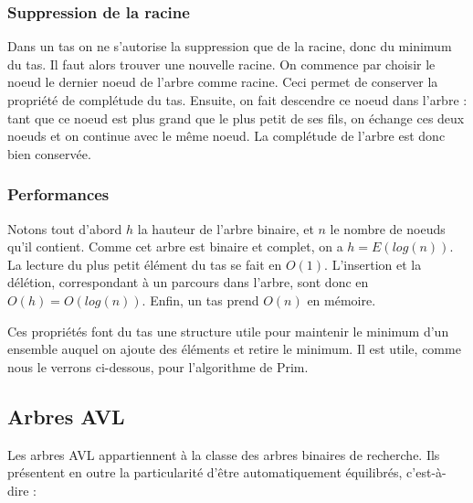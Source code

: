 \documentclass{article}
\begin{document}
\subsubsection{Suppression de la racine}
Dans un tas on ne s'autorise la suppression que de la racine, donc du minimum du tas. Il faut alors trouver une nouvelle racine. On commence par choisir le noeud le 
dernier noeud de l'arbre comme racine. Ceci permet de conserver la propriété de complétude du tas. Ensuite, on fait descendre ce noeud dans l'arbre : tant que ce noeud
est plus grand que le plus petit de ses fils, on échange ces deux noeuds et on continue avec le même noeud. La complétude de l'arbre est donc bien conservée.

\subsubsection{Performances}
Notons tout d'abord $h$ la hauteur de l'arbre binaire, et $n$ le nombre de noeuds qu'il contient. Comme cet arbre est binaire et complet, on a $h = E(log(n))$.
La lecture du plus petit élément du tas se fait en $O(1)$.
L'insertion et la délétion, correspondant à un parcours dans l'arbre, sont donc en $O(h) = O(log(n))$.
Enfin, un tas prend $O(n)$ en mémoire.


Ces propriétés font du tas une structure utile pour maintenir le minimum d'un ensemble auquel on ajoute des éléments et retire le minimum. Il est utile, comme nous le
verrons ci-dessous, pour l'algorithme de Prim.

\subsection{Arbres AVL}

Les arbres AVL appartiennent à la classe des arbres binaires de recherche. Ils présentent en outre la particularité d'être automatiquement équilibrés, c'est-à-dire :
\end{document}
